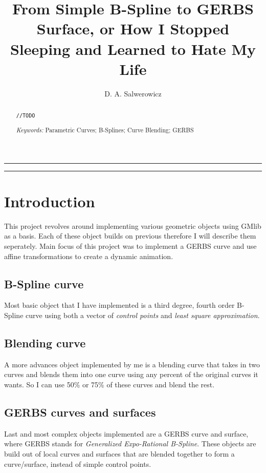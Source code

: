 \documentclass[a4paper,12pt]{extarticle}
\title{From Simple B-Spline to GERBS Surface, or How I Stopped Sleeping and Learned to Hate My Life}
\author{D. A. Salwerowicz}
\date{\parbox{\linewidth}{\centering
    \textit{\small UiT - The Arctic University of Norway, P.O. Box 385, N-8505 Narvik, Norway}\endgraf\bigskip
    \small Submitted \today
}}
\providecommand{\keywords}[1]{\flushleft\textit{\small{Keywords:}} #1}
\begin{document}
  
\maketitle

\noindent\rule{\linewidth}{.5pt}
\begin{abstract} 
\verb|//TODO|

\keywords{Parametric Curves; B-Splines; Curve Blending; GERBS}
\end{abstract}
\rule{\linewidth}{.5pt}


\section{Introduction}
This project revolves around implementing various geometric objects using GMlib as a basis. Each of these object builds on previous therefore I will describe them seperately. Main focus of this project was to implement a GERBS curve and use affine transformations to create a dynamic animation.

\subsection{B-Spline curve}
Most basic object that I have implemented is a third degree, fourth order B-Spline curve using both a vector of \emph{control points} and \emph{least square approximation}.

\subsection{Blending curve}
A more advances object implemented by me is a blending curve that takes in two curves and blends them into one curve using any percent of the original curves it wants. So I can use 50\% or 75\% of these curves and blend the rest.

\subsection{GERBS curves and surfaces}
Last and most complex objects implemented are a GERBS curve and surface, where GERBS stands for \emph{Generalized Expo-Rational B-Spline}. These objects are build out of local curves and surfaces that are blended together to form a curve/surface, instead of simple control points.
\end{document}
